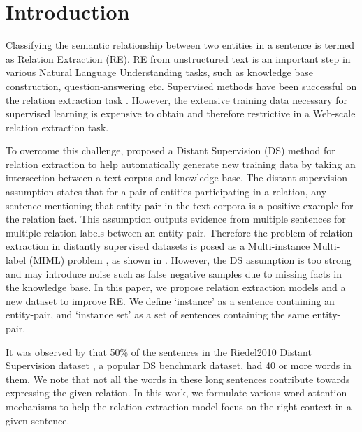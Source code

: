 \documentclass{article}
\begin{document}
\section{Introduction} 
Classifying the semantic relationship between two entities in a sentence is termed as Relation Extraction (RE). RE from unstructured text is an important step in various Natural Language Understanding tasks, such as knowledge base construction, question-answering etc. Supervised methods have been successful on the relation extraction task \cite{bunescu2005shortest,zeng:2014}. However, the extensive training data necessary for supervised learning is expensive to obtain and therefore restrictive in a Web-scale relation extraction task.

 To overcome this challenge, \cite{mintz:2009} proposed a Distant Supervision (DS) method for relation extraction to help automatically generate new training data by taking an intersection between a text corpus and knowledge base. The distant supervision assumption states that for a pair of entities participating in a relation, any sentence mentioning that entity pair in the text corpora is a positive example for the relation fact. This assumption outputs evidence from multiple sentences for multiple relation labels between an entity-pair. Therefore the problem of relation extraction in distantly supervised datasets is posed as a Multi-instance Multi-label (MIML) problem \cite{surdeanu:2012}, as shown in . However, the DS assumption is too strong and may introduce noise such as false negative samples due to missing facts in the knowledge base. In this paper, we propose relation extraction models and a new dataset to improve RE. We define `instance' as a sentence containing an entity-pair, and `instance set' as a set of sentences containing the same entity-pair. 

It was observed by \cite{zeng:2015} that 50\% of the sentences in the Riedel2010 Distant Supervision dataset  \cite{riedel:2010}, a popular DS benchmark dataset, had 40 or more words in them. We note that not all the words in these long sentences contribute towards expressing the given relation. In this work, we formulate various word attention mechanisms to help the relation extraction model focus on the right context in a given sentence. 
\end{document}

